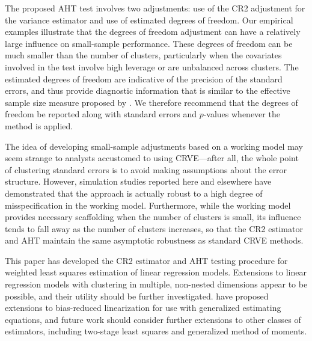 \documentclass[12pt]{article}\usepackage[]{graphicx}\usepackage[]{color}
\newcommand{\bs}{\boldsymbol}
\begin{document}
The proposed AHT test involves two adjustments: use of the CR2 adjustment for the variance estimator and use of estimated degrees of freedom. 
Our empirical examples illustrate that the degrees of freedom adjustment can have a relatively large influence on small-sample performance.
These degrees of freedom can be much smaller than the number of clusters, particularly when the covariates involved in the test involve high leverage or are unbalanced across clusters.
The estimated degrees of freedom are indicative of the precision of the standard errors, and thus provide diagnostic information that is similar to the effective sample size measure proposed by \citet{Carter2013asymptotic}. 
We therefore recommend that the degrees of freedom be reported along with standard errors and $p$-values whenever the method is applied.

The idea of developing small-sample adjustments based on a working model may seem strange to analysts accustomed to using CRVE---after all, the whole point of clustering standard errors is to avoid making assumptions about the error structure.
However, simulation studies reported here and elsewhere  have demonstrated that the approach is actually robust to a high degree of misspecification in the working model. 
Furthermore, while the working model provides necessary scaffolding when the number of clusters is small, its  influence tends to fall away as the number of clusters increases, so that the CR2 estimator and AHT maintain the same asymptotic robustness as standard CRVE methods. 


This paper has developed the CR2 estimator and AHT testing procedure for weighted least squares estimation of linear regression models. 
Extensions to linear regression models with clustering in multiple, non-nested dimensions \citep[cf.][]{Cameron2011robust} appear to be possible, and their utility should be further investigated. 
\citet{McCaffrey2006improved} have proposed extensions to bias-reduced linearization for use with generalized estimating equations, and future work should consider further extensions to other classes of estimators, including two-stage least squares and generalized method of moments. 



\end{document}
